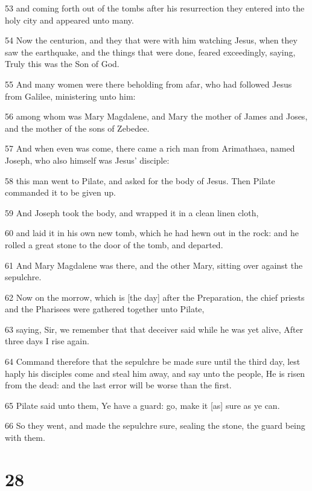 \par 53 and coming forth out of the tombs after his resurrection they entered into the holy city and appeared unto many.
\par 54 Now the centurion, and they that were with him watching Jesus, when they saw the earthquake, and the things that were done, feared exceedingly, saying, Truly this was the Son of God.
\par 55 And many women were there beholding from afar, who had followed Jesus from Galilee, ministering unto him:
\par 56 among whom was Mary Magdalene, and Mary the mother of James and Joses, and the mother of the sons of Zebedee.
\par 57 And when even was come, there came a rich man from Arimathaea, named Joseph, who also himself was Jesus' disciple:
\par 58 this man went to Pilate, and asked for the body of Jesus. Then Pilate commanded it to be given up.
\par 59 And Joseph took the body, and wrapped it in a clean linen cloth,
\par 60 and laid it in his own new tomb, which he had hewn out in the rock: and he rolled a great stone to the door of the tomb, and departed.
\par 61 And Mary Magdalene was there, and the other Mary, sitting over against the sepulchre.
\par 62 Now on the morrow, which is [the day] after the Preparation, the chief priests and the Pharisees were gathered together unto Pilate,
\par 63 saying, Sir, we remember that that deceiver said while he was yet alive, After three days I rise again.
\par 64 Command therefore that the sepulchre be made sure until the third day, lest haply his disciples come and steal him away, and say unto the people, He is risen from the dead: and the last error will be worse than the first.
\par 65 Pilate said unto them, Ye have a guard: go, make it [as] sure as ye can.
\par 66 So they went, and made the sepulchre sure, sealing the stone, the guard being with them.

\chapter{28}

